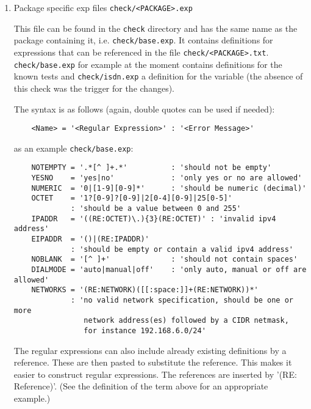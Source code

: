   \begin{enumerate}
  \item Package specific exp files \texttt{check/<PACKAGE>.exp}

    This file can be found in the \texttt{check} directory and has the same name
    as the package containing it, i.e. \texttt{check/base.exp}. It contains
    definitions for expressions that can be referenced in the file \texttt{check/<PACKAGE>.txt}.
    \texttt{check/base.exp} for example at the moment contains definitions for the
    known tests and \texttt{check/isdn.exp} a definition for the variable
     (the absence of this check was the trigger
    for the changes).

The syntax is as follows (again, double quotes can be used if needed):
\begin{example}
\begin{verbatim}
    <Name> = '<Regular Expression>' : '<Error Message>'
\end{verbatim}
\end{example}
as an example \texttt{check/base.exp}:
\begin{example}
\begin{verbatim}
    NOTEMPTY = '.*[^ ]+.*'          : 'should not be empty'
    YESNO    = 'yes|no'             : 'only yes or no are allowed'
    NUMERIC  = '0|[1-9][0-9]*'      : 'should be numeric (decimal)'
    OCTET    = '1?[0-9]?[0-9]|2[0-4][0-9]|25[0-5]'
             : 'should be a value between 0 and 255'
    IPADDR   = '((RE:OCTET)\.){3}(RE:OCTET)' : 'invalid ipv4 address'
    EIPADDR  = '()|(RE:IPADDR)'
             : 'should be empty or contain a valid ipv4 address'
    NOBLANK  = '[^ ]+'              : 'should not contain spaces'
    DIALMODE = 'auto|manual|off'    : 'only auto, manual or off are allowed'
    NETWORKS = '(RE:NETWORK)([[:space:]]+(RE:NETWORK))*'
             : 'no valid network specification, should be one or more
                network address(es) followed by a CIDR netmask,
                for instance 192.168.6.0/24'
\end{verbatim}
\end{example}

The regular expressions can also include already existing definitions by a reference.
These are then pasted to substitute the reference. This makes it easier to construct regular
expressions. The references are inserted by '(RE: Reference)'. (See the definition of the term
 above for an appropriate example.)


\end{enumerate}
